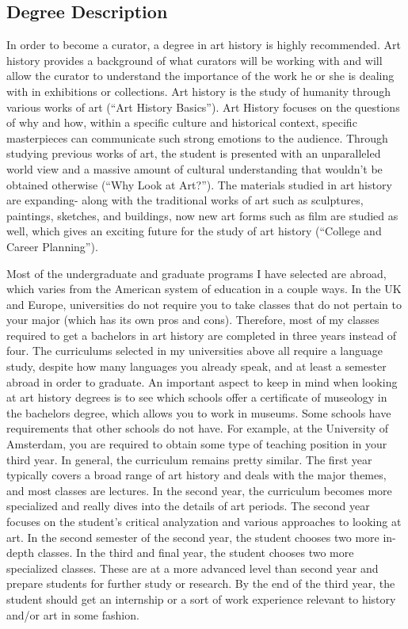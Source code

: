 \begin{multicols}{2}

\section{Degree Description}
	In order to become a curator, a degree in art history is highly recommended. Art history provides a background of what curators will be working with and will allow the curator to understand the importance of the work he or she is dealing with in exhibitions or collections. Art history is the study of humanity through various works of art (“Art History Basics”). Art History focuses on the questions of why and how, within a specific culture and historical context, specific masterpieces can communicate such strong emotions to the audience. Through studying previous works of art, the student is presented with an unparalleled world view and a massive amount of cultural understanding that wouldn’t be obtained otherwise (“Why Look at Art?”). The materials studied in art history are expanding- along with the traditional works of art such as sculptures, paintings, sketches, and buildings, now new art forms such as film are studied as well, which gives an exciting future for the study of art history (“College and Career Planning”). 

	Most of the undergraduate and graduate programs I have selected are abroad, which varies from the American system of education in a couple ways. In the UK and Europe, universities do not require you to take classes that do not pertain to your major (which has its own pros and cons). Therefore, most of my classes required to get a bachelors in art history are completed in three years instead of four. The curriculums selected in my universities above all require a language study, despite how many languages you already speak, and at least a semester abroad in order to graduate. An important aspect to keep in mind when looking at art history degrees is to see which schools offer a certificate of museology in the bachelors degree, which allows you to work in museums. Some schools have requirements that other schools do not have. For example, at the University of Amsterdam, you are required to obtain some type of teaching position in your third year. In general, the curriculum remains pretty similar. The first year typically covers a broad range of art history and deals with the major themes, and most classes are lectures. In the second year, the curriculum becomes more specialized and really dives into the details of art periods. The second year focuses on the student’s critical analyzation and various approaches to looking at art. In the second semester of the second year, the student chooses two more in-depth classes. In the third and final year, the student chooses two more specialized classes. These are at a more advanced level than second year and prepare students for further study or research. By the end of the third year, the student should get an internship or a sort of work experience relevant to history and/or art in some fashion. 


\end{multicols}
